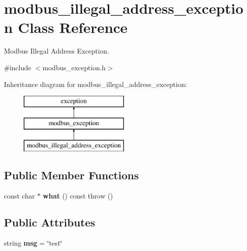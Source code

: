 \hypertarget{classmodbus__illegal__address__exception}{}\section{modbus\+\_\+illegal\+\_\+address\+\_\+exception Class Reference}
\label{classmodbus__illegal__address__exception}


Modbus Illegal Address Exception.  




{\ttfamily \#include $<$modbus\+\_\+exception.\+h$>$}

Inheritance diagram for modbus\+\_\+illegal\+\_\+address\+\_\+exception\+:\begin{figure}[H]
\begin{center}
\leavevmode
\includegraphics[height=3.000000cm]{classmodbus__illegal__address__exception}
\end{center}
\end{figure}
\subsection*{Public Member Functions}
\begin{DoxyCompactItemize}
\item 
\mbox{\label{classmodbus__illegal__address__exception_a231a6fe435cc67cc9b8c65480167cd94}} 
const char $\ast$ {\bfseries what} () const  throw ()
\end{DoxyCompactItemize}
\subsection*{Public Attributes}
\begin{DoxyCompactItemize}
\item 
\mbox{\label{classmodbus__illegal__address__exception_a9b3faa192aafda705fa518851a845c09}} 
string {\bfseries msg} = \char`\"{}test\char`\"{}
\end{DoxyCompactItemize}


